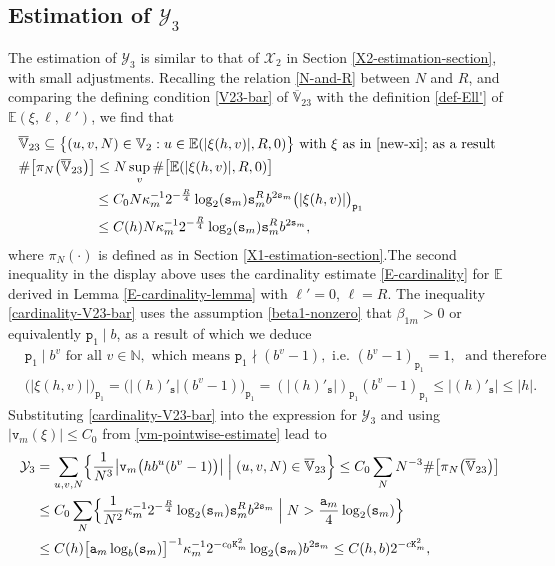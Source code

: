 \documentclass[12pt, twoside]{article}
\theoremstyle{definition}
\numberwithin{equation}{section}
\begin{document}
\subsection{Estimation of $\mathcal Y_3$}
The estimation of $\mathcal Y_3$ is similar to that of $\mathcal X_2$ in Section \ref{X2-estimation-section}, with small adjustments. Recalling the relation \eqref{N-and-R} between $N$ and $R$, and comparing the defining condition \eqref{V23-bar} of $\overline{\mathbb V}_{23}$ with the definition \eqref{def-Ell'} of $\mathbb E(\xi, \ell, \ell')$, we find that  
\begin{align} 
&\overline{\mathbb{\mathbb V}}_{23} \subseteq \bigl\{(u, v, N) \in \mathbb V_2 : u \in \mathbb E(|\xi(h,v)|, R, 0) \bigr\} \text{ with $\xi$ as in \eqref{new-xi}; as a result } \nonumber \\ 
&\# \bigl[ \pi_N \bigl( \overline{\mathbb V}_{23}\bigr) \bigr] \leq  N \sup_{v} \#\bigl[ \mathbb E(|\xi(h,v)|, R, 0) \bigr] \nonumber \\ &\hskip0.75in \leq C_0  {N}\kappa_m^{-1} 2^{-\frac{R}{4}} \log_2 (\mathtt s_m) \mathtt s_m^R b^{2 \mathtt s_m} \bigl(|\xi(h,v)|\bigr)_{\mathtt p_1} \nonumber \\
&\hskip0.75in \leq C(h) {N} \kappa_m^{-1} 2^{-\frac{R}{4}} \log_2 (\mathtt s_m) \mathtt s_m^R b^{2 \mathtt s_m}, \label{cardinality-V23-bar} 
\end{align}  
where $\pi_N(\cdot)$ is defined as in Section \ref{X1-estimation-section}.The second inequality in the display above uses the cardinality estimate \eqref{E-cardinality} for $\mathbb E$ derived in Lemma \ref{E-cardinality-lemma} with $\ell' = 0$, $\ell=R$. The inequality \eqref{cardinality-V23-bar} uses the assumption \eqref{beta1-nonzero} that $\beta_{1m} > 0$ or  equivalently $\mathtt p_1 \mid b$, as a result of which we deduce  
\begin{align*}
& \mathtt p_1 \mid b^v \text{ for all } v \in \mathbb N, \text{ which means } \mathtt p_1 \nmid (b^v-1), \text{ i.e. } (b^v-1)_{\mathtt p_1} = 1, \; \text{ and therefore } \\
&\bigl( |\xi(h,v)|\bigr)_{\mathtt p_1} = \bigl({|(h)'_{\mathtt s}|}(b^v-1)\bigr)_{\mathtt p_1} = ({|(h)'_{\mathtt s}|})_{\mathtt p_1}  (b^v-1)_{\mathtt p_1} \leq |(h)'_{\mathtt s}| \leq |h|. 
\end{align*} 
Substituting \eqref{cardinality-V23-bar} into the expression for $\mathcal Y_3$ {and using $|\mathtt v_m(\xi)| \leq C_0$ from \eqref{vm-pointwise-estimate} lead} to
\begin{align} 
\mathcal Y_3 &= \sum_{u,v, N} \Bigl\{\frac{1}{N^3}\bigl| \mathtt v_m \bigl(hb^u(b^v-1) \bigr) \bigr| \; \Bigl| \; (u, v, N) \in \overline{\mathbb V}_{23} \Bigr\} \leq C_0 \sum_{N} N^{-3} \# \bigl[\pi_N \bigl(\overline{\mathbb V}_{23} \bigr) \bigr] \nonumber \\ 
&\leq C_0 \sum_N \Bigl\{\frac{1}{N^2} \kappa_m^{-1} 2^{-\frac{R}{4}} \log_2 (\mathtt s_m) \mathtt s_m^R b^{2 \mathtt s_m} \; \Bigr| \; N > \frac{\mathtt a_m}{4} \log_2(\mathtt s_m) \Bigr\} \nonumber \\
&\leq C(h) \bigl[ \mathtt a_m \log_b(\mathtt s_m) \bigr]^{-1} \kappa_m^{-1} 2^{-c_0 \mathtt K_m^2} \log_2(\mathtt s_m) b^{2 \mathtt s_m} \leq C(h, b) 2^{-{c} \mathtt K_m^2}, \label{Y3-final}
\end{align} 
\end{document}
